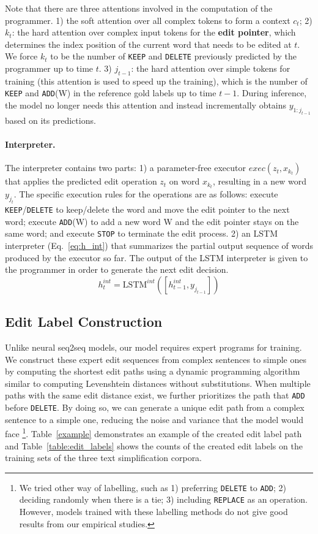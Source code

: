 \documentclass[11pt,a4paper]{article}
\def\add{{\texttt{ADD}}}
\def\delete{{\texttt{DELETE}}}
\def\deletes{{\texttt{DELETE} }}
\def\keep{{\texttt{KEEP}}}
\def\keeps{{\texttt{KEEP} }}
\begin{document}
Note that there are three attentions involved in the computation of the programmer. 1) the soft attention over all complex tokens to form a context $c_t$; 2) $k_{t}$:  the hard attention over complex input tokens for the \textbf{edit pointer}, which determines the index position of the current word that needs to be edited at $t$. We force $k_t$ to be  the number of \keeps and \deletes previously predicted by the programmer up to time $t$. 3) $j_{t-1}$: the hard attention over simple tokens for training (this attention is used to speed up the training), which is the number of \keeps and \add(W) in the reference gold labels up to time $t-1$. During inference, the model no longer needs this attention and instead incrementally obtains $y_{1:j_{t-1}}$ based on its predictions. 

\paragraph{Interpreter.} The interpreter contains two parts: 1) a parameter-free executor $\textit{exec}(z_t, x_{k_t})$ that applies the predicted edit operation $z_t$ on word $x_{k_t}$, resulting in a new word $y_{j_t}$. The specific execution rules for the operations are as follows: execute \keep/\deletes to keep/delete the word and move the edit pointer to the next word; execute \add(W) to add a new word W and the edit pointer stays on the same word; and execute \texttt{STOP} to terminate the edit process. 2) an LSTM interpreter (Eq.~\ref{eq:h_int}) that summarizes the partial output sequence of words produced by the executor so far. The output of the LSTM interpreter is given to the programmer in order to generate the next edit decision. 
\begin{equation}\label{eq:h_int}
    h^{int}_t=\text{LSTM}^{int} ([h^{int}_{t-1},y_{j_{t-1}}])
\end{equation}


\subsection{Edit Label Construction}
\label{sec:label_creation}
Unlike neural seq2seq models, our model requires expert programs for training. We construct these expert edit sequences from complex sentences to simple ones by computing the shortest edit paths using a dynamic programming algorithm similar to computing Levenshtein distances without substitutions. When multiple paths with the same edit distance exist, we further prioritizes the path that \texttt{ADD} before \delete. By doing so, we can generate a unique edit path from a complex sentence to a simple one, reducing the noise and variance that the model would face \footnote{We tried other way of labelling, such as 1) preferring \deletes to \texttt{ADD}; 2) deciding randomly when there is a tie; 3) including \texttt{REPLACE} as an operation. However, models trained with these labelling methods do not give good results from our empirical studies.}. Table~\ref{example} demonstrates an example of the created edit label path and Table~\ref{table:edit_labels} shows the counts of the created edit labels on the training sets of the three text simplification corpora.
\end{document}
